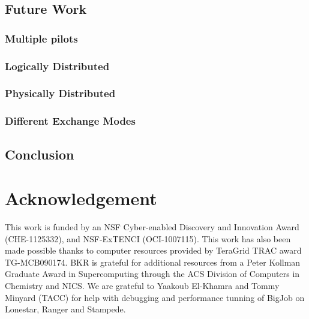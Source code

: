 \documentclass{sig-alternate}
\begin{document}
\subsection{Future Work}

\subsubsection{Multiple pilots}

\subsubsection{Logically Distributed}
\subsubsection{Physically Distributed}

\subsubsection{Different Exchange Modes}


\subsection{Conclusion}

\section*{Acknowledgement} {\footnotesize This work is funded by an
  NSF Cyber-enabled Discovery and Innovation Award (CHE-1125332), and
  NSF-ExTENCI (OCI-1007115). This work has also been made possible
  thanks to computer resources provided by TeraGrid TRAC award
  TG-MCB090174.  BKR is grateful for additional resources from a Peter
  Kollman Graduate Award in Supercomputing through the ACS Division of
  Computers in Chemistry and NICS. We are grateful to Yaakoub
  El-Khamra and Tommy Minyard (TACC) for help with debugging and
  performance tunning of BigJob on Lonestar, Ranger and Stampede.}

%
%

\end{document}

